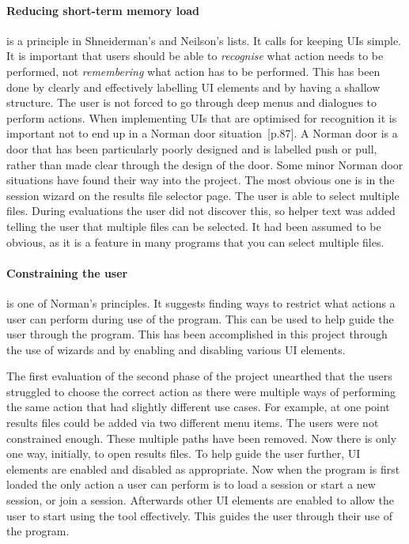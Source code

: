 \paragraph*{Reducing short-term memory load} is a principle in Shneiderman's and Neilson's lists.  It calls for keeping \acp{UI} simple.  It is important that users should be able to \textit{recognise} what action needs to be performed, not \textit{remembering} what action has to be performed.  This has been done by clearly and effectively labelling \ac{UI} elements and by having a shallow structure.  The user is not forced to go through deep menus and dialogues to perform actions.  When implementing \acp{UI} that are optimised for recognition it is important not to end up in a Norman door situation~\cite{design_of_things}[p.87].  A Norman door is a door that has been particularly poorly designed and is labelled push or pull, rather than made clear through the design of the door.  Some minor Norman door situations have found their way into the project.  The most obvious one is in the session wizard on the results file selector page.  The user is able to select multiple files.  During evaluations the user did not discover this, so helper text was added telling the user that multiple files can be selected.  It had been assumed to be obvious, as it is a feature in many programs that you can select multiple files.

\paragraph*{Constraining the user} is one of Norman's principles.  It suggests finding ways to restrict what actions a user can perform during use of the program.  This can be used to help guide the user through the program.  This has been accomplished in this project through the use of wizards and by enabling and disabling various \ac{UI} elements.

The first evaluation of the second phase of the project unearthed that the users struggled to choose the correct action as there were multiple ways of performing the same action that had slightly different use cases.  For example, at one point results files could be added via two different menu items.  The users were not constrained enough.  These multiple paths have been removed. Now there is only one way, initially, to open results files.  To help guide the user further, \ac{UI} elements are enabled and disabled as appropriate.  Now when the program is first loaded the only action a user can perform is to load a session or start a new session, or join a session.  Afterwards other \ac{UI} elements are enabled to allow the user to start using the tool effectively.  This guides the user through their use of the program.

